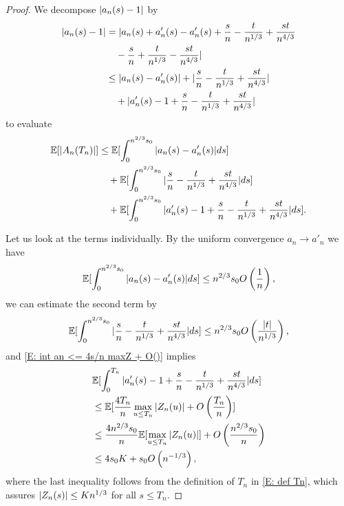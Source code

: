 \begin{proof}
    We decompose $|a_n(s) - 1|$ by
    \begin{equation}
    \begin{aligned}
    |a_n(s)-1| 
    &= | a_n(s) + a'_n(s) - a'_n(s) + \frac{s}{n} - \frac{t}{n^{1 / 3}} + \frac{st}{n^{4 / 3}} \\
    &\quad	- \frac{s}{n} + \frac{t}{n^{1 / 3}} - \frac{st}{n^{4 / 3}} | \\
    &\leq |a_n(s) - a'_n(s)| + 	|\frac{s}{n} - \frac{t}{n^{1 / 3}} + \frac{st}{n^{4 / 3}}| \\
	&\quad    + |a'_n(s) - 1 + \frac{s}{n} - \frac{t}{n^{1 / 3}} + \frac{st}{n^{4 / 3}}|
    \end{aligned}
    \end{equation}
    to evaluate
    \begin{equation}
    \begin{aligned}
    \mathbb{E}[|A_n(T_n)|] 
    &\leq \mathbb{E}[\int_{0}^{n^{2 / 3}s_0} |a_n(s) - a'_n(s)|ds] \\
    &\quad + \mathbb{E}[\int_{0}^{n^{2 / 3}s_0} |\frac{s}{n} - \frac{t}{n^{1 / 3}} + \frac{st}{n^{4 / 3}}| ds] \\
    &\quad + \mathbb{E}[\int_{0}^{n^{2 / 3}s_0} |a'_n(s) - 1 + \frac{s}{n} - \frac{t}{n^{1 / 3}} + \frac{st}{n^{4 / 3}}|ds].
    \end{aligned}
    \end{equation}
    
    Let us look at the terms individually. 
    By the uniform convergence $a_n \rightarrow a'_n$ we have
    \begin{equation}
    \mathbb{E}[\int_{0}^{n^{2 / 3}s_0} |a_n(s) - a'_n(s)|ds] \leq n^{2 / 3}s_0 O\left(\frac{1}{n}\right),
    \end{equation}
    we can estimate the second term by
    \begin{equation}
    \mathbb{E}[\int_{0}^{n^{2 / 3}s_0} |\frac{s}{n} - \frac{t}{n^{1 / 3}} + \frac{st}{n^{4 / 3}}| ds]
    \leq n^{2 / 3}s_0 O\left(\frac{|t|}{n^{1 / 3}}\right),
    \end{equation}
    and \eqref{E: int an <= 4s/n maxZ + O()} implies
    \begin{equation}
    \begin{aligned}
    &\mathbb{E}[\int_{0}^{T_n} |a'_n(s) - 1 + \frac{s}{n} - \frac{t}{n^{1 / 3}} + \frac{st}{n^{4 / 3}}|ds] \\
    &\leq \mathbb{E}[ \frac{4T_n}{n} \max_{u \leq T_n}|Z_n(u)| + O\left(\frac{T_n}{n}\right) ] \\
    &\leq \frac{4n^{2 / 3}s_0}{n} \mathbb{E}[\max_{u \leq T_n}|Z_n(u)|] + O\left(\frac{n^{2 / 3}s_0}{n}\right) \\
    &\leq 4s_0 K + s_0 O\left(n^{-1 / 3}\right),
    \end{aligned}
    \end{equation}
    where the last inequality follows from the definition of $T_n$ in \eqref{E: def Tn},
    which assures $|Z_n(s)| \leq Kn^{1 / 3}$ for all $s \leq T_n$. 
    

\end{proof}
